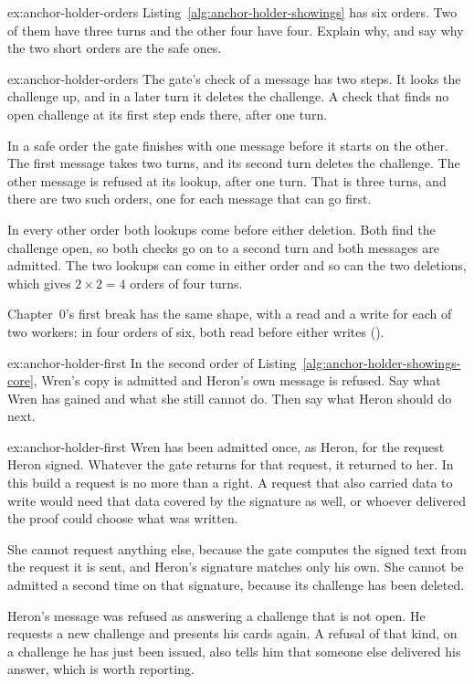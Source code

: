 \documentclass[11pt,a4paper]{article}
\theoremstyle{definition}
\begin{document}

\begin{pdexercise}[kind=Check,rating=1]{ex:anchor-holder-orders}
Listing~\ref{alg:anchor-holder-showings} has six orders. Two of them have three turns and the other four have four. Explain why, and say why the two short orders are the safe ones.
\end{pdexercise}
\begin{pdsolution}{ex:anchor-holder-orders}
The gate's check of a message has two steps. It looks the challenge up, and in a later turn it deletes the challenge. A check that finds no open challenge at its first step ends there, after one turn.

In a safe order the gate finishes with one message before it starts on the other. The first message takes two turns, and its second turn deletes the challenge. The other message is refused at its lookup, after one turn. That is three turns, and there are two such orders, one for each message that can go first.

In every other order both lookups come before either deletion. Both find the challenge open, so both checks go on to a second turn and both messages are admitted. The two lookups can come in either order and so can the two deletions, which gives $2\times2=4$ orders of four turns.

Chapter~0's first break has the same shape, with a read and a write for each of two workers: in four orders of six, both read before either writes ().
\end{pdsolution}
\begin{pdexercise}[kind=Trace,rating=2]{ex:anchor-holder-first}
In the second order of Listing~\ref{alg:anchor-holder-showings-core}, Wren's copy is admitted and Heron's own message is refused. Say what Wren has gained and what she still cannot do. Then say what Heron should do next.
\end{pdexercise}
\begin{pdsolution}{ex:anchor-holder-first}
Wren has been admitted once, as Heron, for the request Heron signed. Whatever the gate returns for that request, it returned to her. In this build a request is no more than a right. A request that also carried data to write would need that data covered by the signature as well, or whoever delivered the proof could choose what was written.

She cannot request anything else, because the gate computes the signed text from the request it is sent, and Heron's signature matches only his own. She cannot be admitted a second time on that signature, because its challenge has been deleted.

Heron's message was refused as answering a challenge that is not open. He requests a new challenge and presents his cards again. A refusal of that kind, on a challenge he has just been issued, also tells him that someone else delivered his answer, which is worth reporting.
\end{pdsolution}
\end{document}
